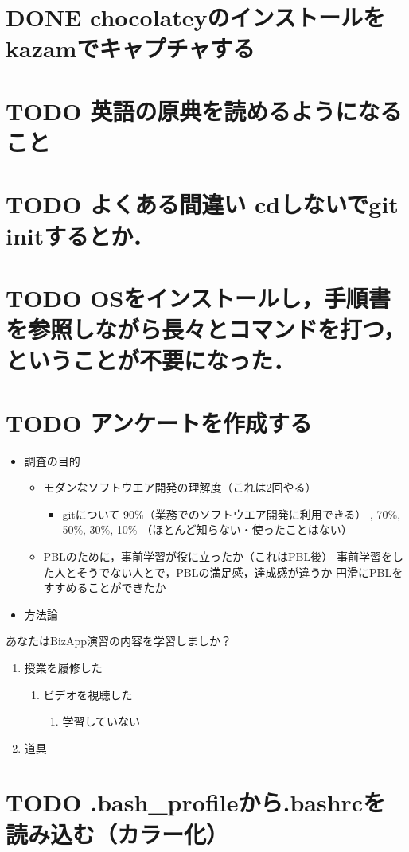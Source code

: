 \documentclass[12pt, t, aspectratio=169]{beamer}
\begin{document}
\section{{\bfseries\sffamily DONE} chocolateyのインストールをkazamでキャプチャする}
\label{sec-19-1}
\section{{\bfseries\sffamily TODO} 英語の原典を読めるようになること}
\label{sec-19-2}
\section{{\bfseries\sffamily TODO} よくある間違い cdしないでgit initするとか．}
\label{sec-19-3}
\section{{\bfseries\sffamily TODO} OSをインストールし，手順書を参照しながら長々とコマンドを打つ，ということが不要になった．}
\label{sec-19-4}
\section{{\bfseries\sffamily TODO} アンケートを作成する}
\label{sec-19-5}
\begin{itemize}
\item 調査の目的
\begin{itemize}
\item モダンなソフトウエア開発の理解度（これは2回やる）
\begin{itemize}
\item gitについて
90\%（業務でのソフトウエア開発に利用できる）
  , 70\%, 50\%, 30\%,
10\% （ほとんど知らない・使ったことはない）
\end{itemize}
\item PBLのために，事前学習が役に立ったか（これはPBL後）
事前学習をした人とそうでない人とで，PBLの満足感，達成感が違うか
円滑にPBLをすすめることができたか
\end{itemize}

\item 方法論
\end{itemize}
あなたはBizApp演習の内容を学習しましか？
\begin{enumerate}
\item 授業を履修した
\begin{enumerate}
\item ビデオを視聴した
\begin{enumerate}
\item 学習していない
\end{enumerate}
\end{enumerate}
\item 道具
\end{enumerate}
\section{{\bfseries\sffamily TODO} .bash\_profileから.bashrcを読み込む（カラー化）}
\label{sec-19-6}
\end{document}

